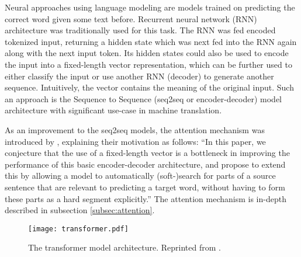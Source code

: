 Neural approaches using language modeling are models trained on predicting the correct word given some text before.  %
Recurrent neural network (RNN) architecture was traditionally used for this task.
The RNN was fed encoded tokenized input, returning a hidden state which was next fed into the RNN again along with the next input token.
Its hidden states could also be used to encode the input into a fixed-length vector representation, which can be further used to either classify the input or use another RNN (decoder) to generate another sequence.
Intuitively, the vector contains the meaning of the original input. 
Such an approach is the Sequence to Sequence (seq2seq or encoder-decoder) model architecture \citep{seq2seq} with significant use-case in machine translation.

As an improvement to the seq2seq models, the attention mechanism was introduced by \citet{first-attention}, explaining their motivation as follows: ``In this paper, we conjecture that the use of a fixed-length vector is a bottleneck in improving the performance of this basic encoder-decoder architecture, and propose to extend this by allowing a model to automatically (soft-)search for parts of a source sentence that are relevant to predicting a target word, without having to form these parts as a hard segment explicitly.'' The attention mechanism is in-depth described in subsection \ref{subsec:attention}.

\begin{figure}[b!]
        \centering
        \texttt{[image: transformer.pdf]}
        \caption{The transformer model architecture. Reprinted from \citep{attention-is-all-you-need}.}
        \label{fig:transformer}
\end{figure}

